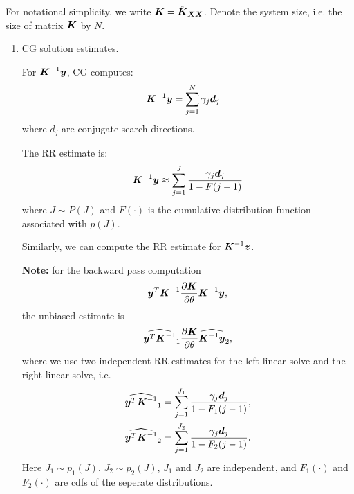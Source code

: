 \documentclass{article}
\begin{document}
For notational simplicity, we write $\boldsymbol{K} = \hat{\boldsymbol{K}}_{\boldsymbol{X} \boldsymbol{X}}$.
Denote the system size, i.e. the size of matrix $\boldsymbol{K}$ by $N$.
\begin{enumerate}
  \item CG solution estimates.

  For $\boldsymbol{K}^{-1} \boldsymbol{y}$, CG computes:
  \begin{align}
    \boldsymbol{K}^{-1} \boldsymbol{y} &= \sum_{j=1}^N \gamma_j \boldsymbol{d}_j
  \end{align}
  where $d_j$ are conjugate search directions.

  The RR estimate is:
  \begin{align}
    \boldsymbol{K}^{-1} \boldsymbol{y} \approx \sum_{j=1}^J \frac{\gamma_j \boldsymbol{d}_j}{1-F(j-1)}
  \end{align}
  where $J \sim P(J)$ and $F(\cdot)$ is the cumulative distribution function associated with $p(J)$.

  Similarly, we can compute the RR estimate for $\boldsymbol{K}^{-1}\boldsymbol{z}$.

  \textbf{Note:} for the backward pass computation
  \begin{align*}
    \boldsymbol{y}^T \boldsymbol{K}^{-1} \frac{\partial \boldsymbol{K}}{\partial \theta}  \boldsymbol{K}^{-1} \boldsymbol{y},
  \end{align*}
  the unbiased estimate is
  \begin{align}
    \widehat{\boldsymbol{y}^T \boldsymbol{K}^{-1}}_1 \frac{\partial \boldsymbol{K}}{\partial \theta}  \widehat{\boldsymbol{K}^{-1} \boldsymbol{y}}_2,
  \end{align}
   where we use two independent RR estimates for the left linear-solve and the right linear-solve, i.e.
  \begin{align}
    \widehat{\boldsymbol{y}^T \boldsymbol{K}^{-1}}_1 &= \sum_{j=1}^{J_1} \frac{\gamma_j \boldsymbol{d}_j} {1-F_1 (j-1)}, \\
    \widehat{\boldsymbol{y}^T \boldsymbol{K}^{-1}}_2 &= \sum_{j=1}^{J_2} \frac{\gamma_j \boldsymbol{d}_j}{1-F_2 (j-1)}.
  \end{align}
   Here $J_1 \sim p_1(J)$, $J_2 \sim p_2(J)$, $J_1$ and $J_2$ are independent, and
  $F_1(\cdot)$ and $F_2(\cdot)$ are cdfs of the seperate distributions.


\end{enumerate}
\end{document}
